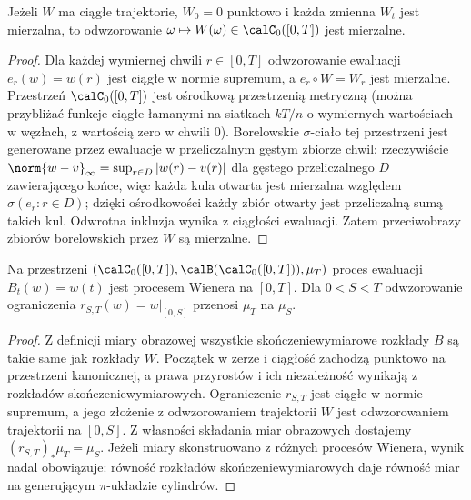 \begin{stwierdzenie}
Jeżeli $W$ ma ciągłe trajektorie, $W_0=0$ punktowo
i każda zmienna $W_t$ jest mierzalna, to odwzorowanie
$\omega\mapsto W(\omega)\in\calC_0([0,T])$ jest mierzalne.
\end{stwierdzenie}
\begin{proof}
Dla każdej wymiernej chwili $r\in[0,T]$ odwzorowanie
ewaluacji $e_r(w)=w(r)$ jest ciągłe w normie supremum,
a $e_r\circ W=W_r$ jest mierzalne.
Przestrzeń $\calC_0([0,T])$ jest ośrodkową przestrzenią
metryczną (można przybliżać funkcje ciągłe łamanymi
na siatkach $kT/n$ o wymiernych wartościach w węzłach,
z wartością zero w chwili $0$).
Borelowskie $\sigma$-ciało tej przestrzeni jest generowane
przez ewaluacje w przeliczalnym gęstym zbiorze chwil:
rzeczywiście $\norm{w-v}_\infty=\sup_{r\in D}|w(r)-v(r)|$
dla gęstego przeliczalnego $D$ zawierającego końce,
więc każda kula otwarta jest mierzalna względem
$\sigma(e_r:r\in D)$; dzięki ośrodkowości każdy zbiór
otwarty jest przeliczalną sumą takich kul.
Odwrotna inkluzja wynika z ciągłości ewaluacji.
Zatem przeciwobrazy zbiorów borelowskich przez $W$
są mierzalne.
\end{proof}

\begin{stwierdzenie}
Na przestrzeni $(\calC_0([0,T]),\calB(\calC_0([0,T])),\mu_T)$
proces ewaluacji $B_t(w)=w(t)$ jest procesem Wienera
na $[0,T]$. Dla $0<S<T$ odwzorowanie ograniczenia
$r_{S,T}(w)=w|_{[0,S]}$ przenosi $\mu_T$ na $\mu_S$.
\end{stwierdzenie}
\begin{proof}
Z definicji miary obrazowej wszystkie skończeniewymiarowe
rozkłady $B$ są takie same jak rozkłady $W$.
Początek w zerze i ciągłość zachodzą punktowo
na przestrzeni kanonicznej, a prawa przyrostów
i ich niezależność wynikają z rozkładów
skończeniewymiarowych. Ograniczenie $r_{S,T}$ jest
ciągłe w normie supremum, a jego złożenie
z odwzorowaniem trajektorii $W$ jest odwzorowaniem
trajektorii na $[0,S]$. Z własności składania miar
obrazowych dostajemy $(r_{S,T})_*\mu_T=\mu_S$.
Jeżeli miary skonstruowano z różnych procesów Wienera,
wynik nadal obowiązuje: równość rozkładów
skończeniewymiarowych daje równość miar na
generującym $\pi$-układzie cylindrów.
\end{proof}

